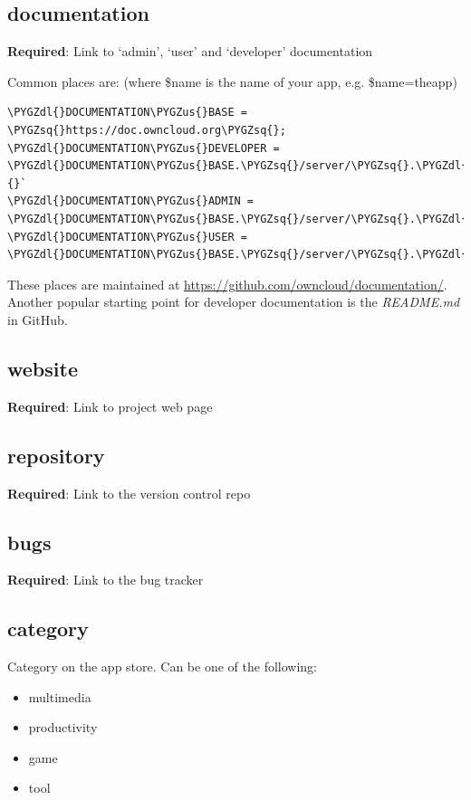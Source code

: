 \documentclass[letterpaper,10pt,english]{sphinxmanual}
\def\PYGZus{\char`\_}
\def\PYGZdl{\char`\$}
\def\PYGZsq{\char`\'}
\begin{document}
\subsection{documentation}
\label{app/info:documentation}
\textbf{Required}: Link to `admin', `user' and `developer' documentation

Common places are: (where \$name is the name of your app, e.g. \$name=theapp)

\begin{Verbatim}[commandchars=\\\{\}]
\PYGZdl{}DOCUMENTATION\PYGZus{}BASE = \PYGZsq{}https://doc.owncloud.org\PYGZsq{};
\PYGZdl{}DOCUMENTATION\PYGZus{}DEVELOPER = \PYGZdl{}DOCUMENTATION\PYGZus{}BASE.\PYGZsq{}/server/\PYGZsq{}.\PYGZdl{}VERSIONS\PYGZus{}SERVER\PYGZus{}MAJOR\PYGZus{}DEV\PYGZus{}DOCS.\PYGZsq{}/developer\PYGZus{}manual/\PYGZdl{}name/\PYGZsq{};{}`
\PYGZdl{}DOCUMENTATION\PYGZus{}ADMIN = \PYGZdl{}DOCUMENTATION\PYGZus{}BASE.\PYGZsq{}/server/\PYGZsq{}.\PYGZdl{}VERSIONS\PYGZus{}SERVER\PYGZus{}MAJOR\PYGZus{}STABLE.\PYGZsq{}/admin\PYGZus{}manual/\PYGZdl{}name/\PYGZsq{};
\PYGZdl{}DOCUMENTATION\PYGZus{}USER = \PYGZdl{}DOCUMENTATION\PYGZus{}BASE.\PYGZsq{}/server/\PYGZsq{}.\PYGZdl{}VERSIONS\PYGZus{}SERVER\PYGZus{}MAJOR\PYGZus{}STABLE.\PYGZsq{}/user\PYGZus{}manual/\PYGZdl{}name/\PYGZsq{};
\end{Verbatim}

These places are maintained at \href{https://github.com/owncloud/documentation/}{https://github.com/owncloud/documentation/}.
Another popular starting point for developer documentation is the \emph{README.md} in GitHub.


\subsection{website}
\label{app/info:website}
\textbf{Required}: Link to project web page


\subsection{repository}
\label{app/info:repository}
\textbf{Required}: Link to the version control repo


\subsection{bugs}
\label{app/info:bugs}
\textbf{Required}: Link to the bug tracker


\subsection{category}
\label{app/info:category}
Category on the app store. Can be one of the following:
\begin{itemize}
\item {} 
multimedia

\item {} 
productivity

\item {} 
game

\item {} 
tool

\end{itemize}
\end{document}
